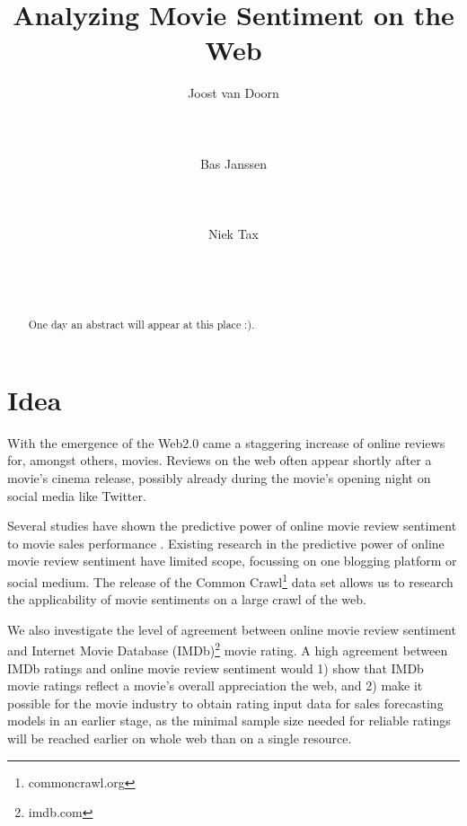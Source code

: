 \documentclass{sig-alternate-br}
\begin{document}

\title{Analyzing Movie Sentiment on the Web}

\author{
\alignauthor Joost van Doorn\\
       \\
       \\
       \\
\alignauthor Bas Janssen\\
       \\
       \\
       \\
\alignauthor Niek Tax\\
       \\
       \\
       \\
}

\maketitle
\begin{abstract}
One day an abstract will appear at this place :).
\end{abstract} 


\section{Idea}
With the emergence of the Web2.0 came a staggering increase of online reviews for, amongst others, movies. Reviews on the web often appear shortly after a movie's cinema release, possibly already during the movie's opening night on social media like Twitter. 

Several studies have shown the predictive power of online movie review sentiment to movie sales performance \cite{Mishne2006, Liu2007, Asur2010, Yu2012}. Existing research in the predictive power of online movie review sentiment have limited scope, focussing on one blogging platform or social medium. The release of the Common Crawl\footnote{commoncrawl.org} data set allows us to research the applicability of movie sentiments on a large crawl of the web.  

We also investigate the level of agreement between online movie review sentiment and Internet Movie Database (IMDb)\footnote{imdb.com} movie rating. A high agreement between IMDb ratings and online movie review sentiment would 1) show that IMDb movie ratings reflect a movie's overall appreciation the web, and 2) make it possible for the movie industry to obtain rating input data for sales forecasting models in an earlier stage, as the minimal sample size needed for reliable ratings will be reached earlier on whole web than on a single resource.
\end{document}
